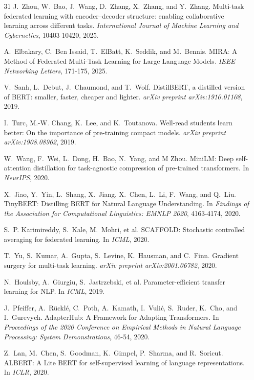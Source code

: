\begin{thebibliography}{31}
J.~Zhou, W.~Bao, J.~Wang, D.~Zhang, X.~Zhang, and Y.~Zhang.
Multi-task federated learning with encoder–decoder structure: enabling collaborative learning across different tasks.
\emph{International Journal of Machine Learning and Cybernetics}, 10403-10420, 2025.

A.~Elbakary, C.~Ben Issaid, T.~ElBatt, K.~Seddik, and M.~Bennis.
MIRA: A Method of Federated Multi-Task Learning for Large Language Models.
\emph{IEEE Networking Letters}, 171-175, 2025.

V.~Sanh, L.~Debut, J.~Chaumond, and T.~Wolf.
DistilBERT, a distilled version of BERT: smaller, faster, cheaper and lighter.
\emph{arXiv preprint arXiv:1910.01108}, 2019.

I.~Turc, M.-W. Chang, K.~Lee, and K.~Toutanova.
Well-read students learn better: On the importance of pre-training compact models.
\emph{arXiv preprint arXiv:1908.08962}, 2019.

W.~Wang, F.~Wei, L.~Dong, H.~Bao, N.~Yang, and M Zhou.
MiniLM: Deep self-attention distillation for task-agnostic compression of pre-trained transformers.
In \emph{NeurIPS}, 2020.

X.~Jiao, Y.~Yin, L.~Shang, X.~Jiang, X.~Chen, L.~Li, F.~Wang, and Q.~Liu.
TinyBERT: Distilling BERT for Natural Language Understanding.
In \emph{Findings of the Association for Computational Linguistics: EMNLP 2020}, 4163-4174, 2020.

S.~P. Karimireddy, S.~Kale, M.~Mohri, et al.
SCAFFOLD: Stochastic controlled averaging for federated learning.
In \emph{ICML}, 2020.

T.~Yu, S.~Kumar, A.~Gupta, S.~Levine, K.~Hausman, and C.~Finn.
Gradient surgery for multi-task learning.
\emph{arXiv preprint arXiv:2001.06782}, 2020.

N.~Houlsby, A.~Giurgiu, S.~Jastrzebski, et al.
Parameter-efficient transfer learning for NLP.
In \emph{ICML}, 2019.

J.~Pfeiffer, A.~Rücklé, C.~Poth, A.~Kamath, I.~Vulić, S.~Ruder, K.~Cho, and I.~Gurevych.
AdapterHub: A Framework for Adapting Transformers.
In \emph{Proceedings of the 2020 Conference on Empirical Methods in Natural Language Processing: System Demonstrations}, 46-54, 2020.

Z.~Lan, M.~Chen, S.~Goodman, K.~Gimpel, P.~Sharma, and R.~Soricut.
ALBERT: A Lite BERT for self-supervised learning of language representations.
In \emph{ICLR}, 2020.


\end{thebibliography}
